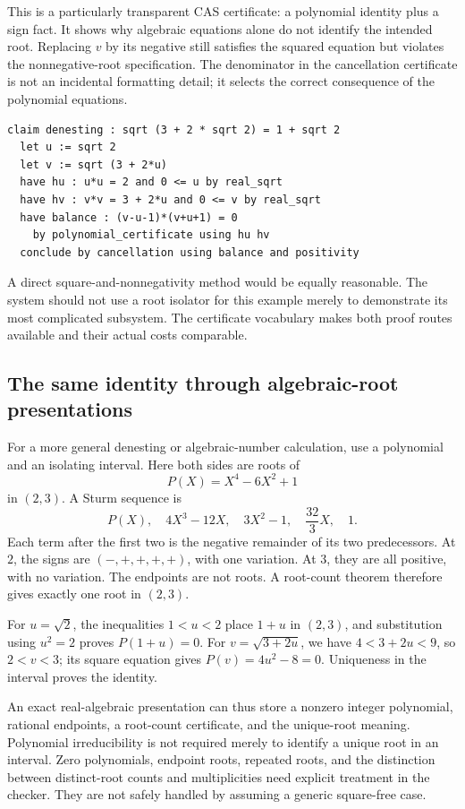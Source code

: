 \documentclass[11pt,a4paper]{article}
\theoremstyle{definition}
\begin{document}
This is a particularly transparent CAS certificate: a polynomial identity plus
a sign fact. It shows why algebraic equations alone do not identify the intended
root. Replacing \(v\) by its negative still satisfies the squared equation but
violates the nonnegative-root specification. The denominator in the cancellation
certificate is not an incidental formatting detail; it selects the correct
consequence of the polynomial equations.

\begin{lstlisting}
claim denesting : sqrt (3 + 2 * sqrt 2) = 1 + sqrt 2
  let u := sqrt 2
  let v := sqrt (3 + 2*u)
  have hu : u*u = 2 and 0 <= u by real_sqrt
  have hv : v*v = 3 + 2*u and 0 <= v by real_sqrt
  have balance : (v-u-1)*(v+u+1) = 0
    by polynomial_certificate using hu hv
  conclude by cancellation using balance and positivity
\end{lstlisting}

A direct square-and-nonnegativity method would be equally reasonable. The system
should not use a root isolator for this example merely to demonstrate its most
complicated subsystem. The certificate vocabulary makes both proof routes
available and their actual costs comparable.

\subsection{The same identity through algebraic-root presentations}
For a more general denesting or algebraic-number calculation, use a polynomial
and an isolating interval. Here both sides are roots of
\[
 P(X)=X^4-6X^2+1
\]
in \((2,3)\). A Sturm sequence is
\begin{equation}\label{eq:sturm}
 P(X),\quad 4X^3-12X,\quad 3X^2-1,\quad \frac{32}{3}X,\quad 1.
\end{equation}
Each term after the first two is the negative remainder of its two predecessors.
At \(2\), the signs are \((-,+,+,+,+)\), with one variation. At \(3\), they are
all positive, with no variation. The endpoints are not roots. A root-count
theorem therefore gives exactly one root in \((2,3)\).

For \(u=\sqrt2\), the inequalities \(1<u<2\) place \(1+u\) in \((2,3)\), and
substitution using \(u^2=2\) proves \(P(1+u)=0\). For
\(v=\sqrt{3+2u}\), we have \(4<3+2u<9\), so \(2<v<3\); its square equation
gives \(P(v)=4u^2-8=0\). Uniqueness in the interval proves the identity.

An exact real-algebraic presentation can thus store a nonzero integer polynomial,
rational endpoints, a root-count certificate, and the unique-root meaning.
Polynomial irreducibility is not required merely to identify a unique root in
an interval. Zero polynomials, endpoint roots, repeated roots, and the distinction
between distinct-root counts and multiplicities need explicit treatment in the
checker. They are not safely handled by assuming a generic square-free case.
\end{document}
